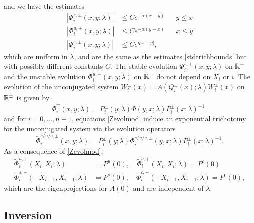 \documentclass[12pt]{elsarticle}
\theoremstyle{plain}
\theoremstyle{definition}
\theoremstyle{remark}
\numberwithin{theorem}{section}
\numberwithin{equation}{section}
\begin{document}
and we have the estimates
\begin{equation}\label{Zevolbounds}
\begin{aligned}
|\Phi_i^{s,\pm}(x, y; \lambda)| &\leq C e^{-\alpha(x - y)} && y \leq x \\
|\Phi_i^{u,\pm}(x, y; \lambda)| &\leq C e^{-\alpha(y - x)} && x \leq y \\
|\Phi_i^{c,\pm}(x, y; \lambda)| &\leq C e^{\eta|x - y|},
\end{aligned}
\end{equation}
which are uniform in $\lambda$, and are the same as the estimates \cref{stdtrichbounds} but with possibly different constants $C$. The stable evolution $\Phi_i^{s,+}(x, y; \lambda)$ on $\mathbb{R}^+$ and the unstable evolution $\Phi_i^{u,-}(x, y; \lambda)$ on $\mathbb{R}^-$ do not depend on $X_i$ or $i$. The evolution of the unconjugated system $W_i^\pm(x) = A(Q_i^\pm(x); \lambda) W_i^\pm(x)$ on $\mathbb{R}^\pm$ is given by
\begin{equation}\label{unconjevol2}
\tilde{\Phi}_i^\pm(x, y; \lambda) = P_i^\pm(y; \lambda) \Phi(y, x; \lambda) P_i^\pm(x; \lambda)^{-1},
\end{equation}
and for $i = 0, \dots, n-1$, equations \cref{Zevolmod} induce an exponential trichotomy for the unconjugated system via the evolution operators
\begin{equation}\label{trichunconj}
\tilde{\Phi}_i^{s/u/c,\pm}(x, y; \lambda) = P_i^\pm(y; \lambda) \Phi_i^{s/u/c,\pm}(y, x; \lambda) P_i^\pm(x; \lambda)^{-1}.
\end{equation}
As a consequence of \cref{Zevolmod},
\begin{align*}
\tilde{\Phi}_i^{u,+}(X_i, X_i ; \lambda) &= P^u(0), \quad
\tilde{\Phi}_i^{c,+}(X_i, X_i ; \lambda) = P^c(0) \\
\tilde{\Phi}_i^{s,-}(-X_{i-1}, X_{i-1} ; \lambda) &= P^s(0), \quad
\tilde{\Phi}_i^{c,-}(-X_{i-1}, X_{i-1} ; \lambda) = P^c(0),
\end{align*}
which are the eigenprojections for $A(0)$ and are independent of $\lambda$.

\subsection{Inversion}
\end{document}
